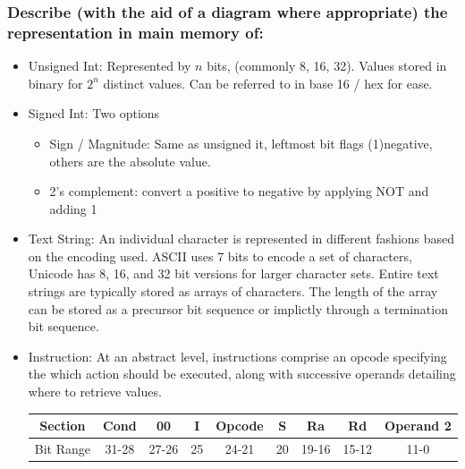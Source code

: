 \documentclass[]{article}
\begin{document}
        \subsubsection{Describe (with the aid of a diagram where appropriate) the representation in main memory of:}
            \begin{itemize}
                \item Unsigned Int: Represented by $n$ bits, (commonly 8, 16, 32). Values stored in binary for $2^n$ distinct values. Can be referred to in base 16 / hex for ease.
                \item Signed Int: Two options
                    \begin{itemize}
                        \item Sign / Magnitude: Same as unsigned it, leftmost bit flags (1)negative, others are the absolute value.
                        \item 2's complement: convert a positive to negative by applying NOT and adding 1
                    \end{itemize}
                \item Text String: An individual character is represented in different fashions based on the encoding used. ASCII uses 7 bits to encode a set of characters, Unicode has 8, 16, and 32 bit versions for larger character sets. Entire text strings are typically stored as arrays of characters. The length of the array can be stored as a precursor bit sequence or implictly through a termination bit sequence.
                \item Instruction: At an abstract level, instructions comprise an opcode specifying the which action should be executed, along with successive operands detailing where to retrieve values.

                \newpage
                \begin{table}[ht]
                    \centering
                    \begin{tabular}{c|cccccccc}\hline
                    Section & Cond & 00 & I & Opcode & S & Ra & Rd & Operand 2 \\\hline
                    Bit Range & 31-28 & 27-26 & 25 & 24-21 & 20 & 19-16 & 15-12 & 11-0 \\\hline
                    \end{tabular}
                \end{table}


\end{itemize}
\end{document}
